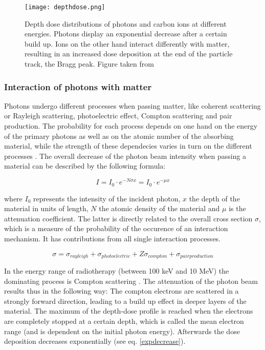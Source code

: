 \documentclass[type=dr, dr=rernat, accentcolor=tud7b,colorbacktitle, bigchapter, openright, twoside, 12pt ]{tudthesis}
\begin{document}
\vspace*{1cm}
 
\begin{figure}[H]
\begin{center}
\texttt{[image: depthdose.png]}
\caption{Depth dose distributions of photons and carbon ions at different energies. Photons display an exponential decrease after a certain 
build up. Ions on the other hand interact differently with matter, resulting in an increased dose deposition at the end of the particle 
track, the Bragg peak. Figure taken from \cite{Lue12}}
\label{ddp}
\end{center}
\end{figure}

\subsubsection{Interaction of photons with matter}

Photons undergo different processes when passing matter, like coherent scattering or Rayleigh scattering, photoelectric effect, Compton 
scattering and pair production. The probability for each process depends on one hand on the energy of the primary photons as well as on the 
atomic number of the absorbing material, while the strength of these dependecies varies in turn on the different processes \cite{Lil06}. 
The overall decrease of the photon beam intensity when passing a material can be described by the following formula:

\begin{equation}
 I = I_{0} \cdot e^{- N \sigma x} = I_{0} \cdot e^{-\mu x}
 \label{expdecrease}
\end{equation} 

where $I_{0}$ represents the intensity of the incident photon, $x$ the depth of the material in units of length, $N$ the atomic density 
of the material and $\mu$ is the attenuation coefficient. The latter is directly related to the overall cross section $\sigma$, which is a 
measure of the probability of the occurence of an interaction mechanism. It has contributions from all single interaction processes. 

\begin{equation}
{\sigma} = \sigma_{rayleigh} + \sigma_{photoelectric} + Z\sigma_{compton} + \sigma_{pairproduction} 
\end{equation}

In the energy range of radiotherapy (between 100 keV and 10 MeV) the dominating process is Compton scattering \cite{Alp98}. 
The attenuation of the photon beam results thus in the following way: 
The compton electrons are scattered in a strongly forward direction, leading to a build up effect in deeper layers of the material. The 
maximum of the depth-dose profile is reached when the electrons are completely stopped at a certain depth, which is called the mean electron 
range (and is dependent on the initial photon energy). Afterwards the dose deposition decreases exponentially (see eq. \ref{expdecrease}). 
\end{document}
